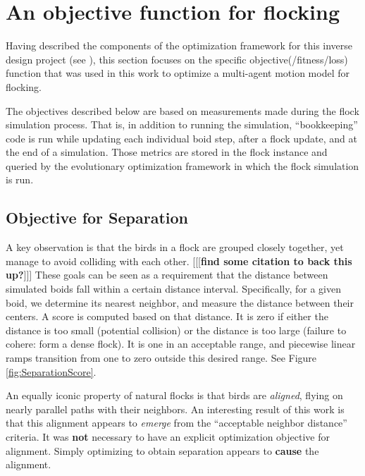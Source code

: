 \documentclass[letterpaper]{article}
\begin{document}

\section{An objective function for flocking}
\label{sec:FlockingObjective}

Having described the components of the optimization framework for this inverse design project (see ), this section focuses on the specific objective(/fitness/loss) function that was used in this work to optimize a multi-agent motion model for flocking.

The objectives described below are based on measurements made during the flock simulation process. That is, in addition to running the simulation, ``bookkeeping'' code is run while updating each individual boid step, after a flock update, and at the end of a simulation. Those metrics are stored in the flock instance and queried by the evolutionary optimization framework in which the flock simulation is run.

\subsection{Objective for Separation}
\label{subsec:separation_objective}

A key observation is that the birds in a flock are grouped closely together, yet manage to avoid colliding with each other. [[[\textbf{find some citation to back this up?}]]] These goals can be seen as a requirement that the distance between simulated boids fall within a certain distance interval. Specifically, for a given boid, we determine its nearest neighbor, and measure the distance between their centers. A score is computed based on that distance. It is zero if either the distance is too small (potential collision) or the distance is too large (failure to cohere: form a dense flock). It is one in an acceptable range, and piecewise linear ramps transition from one to zero outside this desired range. See Figure \ref{fig:SeparationScore}.

An equally iconic property of natural flocks is that birds are \textit{aligned}, flying on nearly parallel paths with their neighbors. An interesting result of this work is that this alignment appears to \textit{emerge} from the ``acceptable neighbor distance'' criteria. It was \textbf{not} necessary to have an explicit optimization objective for alignment. Simply optimizing to obtain separation appears to \textbf{cause} the alignment.
\end{document}
